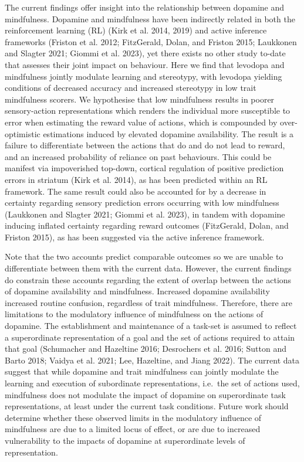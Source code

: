 \documentclass{article}
\begin{document}
The current findings offer insight into the relationship between
dopamine and mindfulness. Dopamine and mindfulness have been indirectly
related in both the reinforcement learning (RL) (Kirk et al. 2014, 2019)
and active inference frameworks (Friston et al. 2012; FitzGerald, Dolan,
and Friston 2015; Laukkonen and Slagter 2021; Giommi et al. 2023), yet
there exists no other study to-date that assesses their joint impact on
behaviour. Here we find that levodopa and mindfulness jointly modulate
learning and stereotypy, with levodopa yielding conditions of decreased
accuracy and increased stereotypy in low trait mindfulness scorers. We
hypothesise that low mindfulness results in poorer sensory-action
representations which renders the individual more susceptible to error
when estimating the reward value of actions, which is compounded by
over-optimistic estimations induced by elevated dopamine availability.
The result is a failure to differentiate between the actions that do and
do not lead to reward, and an increased probability of reliance on past
behaviours. This could be manifest via impoverished top-down, cortical
regulation of positive prediction errors in striatum (Kirk et al. 2014),
as has been predicted within an RL framework. The same result could also
be accounted for by a decrease in certainty regarding sensory prediction
errors occurring with low mindfulness (Laukkonen and Slagter 2021;
Giommi et al. 2023), in tandem with dopamine inducing inflated certainty
regarding reward outcomes (FitzGerald, Dolan, and Friston 2015), as has
been suggested via the active inference framework.

Note that the two accounts predict comparable outcomes so we are unable
to differentiate between them with the current data. However, the
current findings do constrain these accounts regarding the extent of
overlap between the actions of dopamine availability and mindfulness.
Increased dopamine availability increased routine confusion, regardless
of trait mindfulness. Therefore, there are limitations to the modulatory
influence of mindfulness on the actions of dopamine. The establishment
and maintenance of a task-set is assumed to reflect a superordinate
representation of a goal and the set of actions required to attain that
goal (Schumacher and Hazeltine 2016; Desrochers et al. 2016; Sutton and
Barto 2018; Vaidya et al. 2021; Lee, Hazeltine, and Jiang 2022). The
current data suggest that while dopamine and trait mindfulness can
jointly modulate the learning and execution of subordinate
representations, i.e.~the set of actions used, mindfulness does not
modulate the impact of dopamine on superordinate task representations,
at least under the current task conditions. Future work should determine
whether these observed limits in the modulatory influence of mindfulness
are due to a limited locus of effect, or are due to increased
vulnerability to the impacts of dopamine at superordinate levels of
representation.
\end{document}
